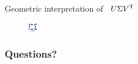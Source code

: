 \documentclass{beamer}
\begin{document}
\begin{frame}[t]{Geometric interpretation of \ $U\Sigma V^{{\sf T}}$}
\begin{figure}[H]
	\begin{center}
	\includegraphics[width = 0.6\linewidth]{../figures/svd.pdf}
	\end{center}
\end{figure}

\end{frame}

\appendix
\backupbegin
\begin{frame}[t]
	\frametitle{Questions?}
	\grid

	\pause
\end{frame}
\backupend
\end{document}
